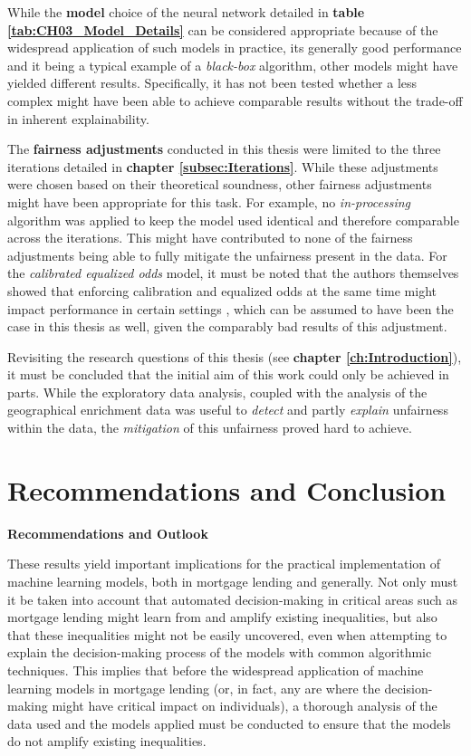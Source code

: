 While the \textbf{model} choice of the neural network detailed in \textbf{table \ref{tab:CH03_Model_Details}} can be considered appropriate because of the widespread application of such models in practice, its generally good performance and it being a typical example of a \textit{black-box} algorithm, other models might have yielded different results.
Specifically, it has not been tested whether a less complex might have been able to achieve comparable results without the trade-off in inherent explainability.

The \textbf{fairness adjustments} conducted in this thesis were limited to the three iterations detailed in \textbf{chapter \ref{subsec:Iterations}}. While these adjustments were chosen based on their theoretical soundness, other fairness adjustments might have been appropriate for this task.
For example, no \textit{in-processing} algorithm was applied to keep the model used identical and therefore comparable across the iterations. This might have contributed to none of the fairness adjustments being able to fully mitigate the unfairness present in the data.
For the \textit{calibrated equalized odds} model, it must be noted that the authors themselves showed that enforcing calibration and equalized odds at the same time might impact performance in certain settings \parencite{Pleiss2017}, which can be assumed to have been the case in this thesis as well, given the comparably bad results of this adjustment.

Revisiting the research questions of this thesis (see \textbf{chapter \ref{ch:Introduction}}), it must be concluded that the initial aim of this work could only be achieved in parts. 
While the exploratory data analysis, coupled with the analysis of the geographical enrichment data was useful to \textit{detect} and partly \textit{explain} unfairness within the data, the \textit{mitigation} of this unfairness proved hard to achieve. 

\section{Recommendations and Conclusion}\label{sec:conclusion}

\textbf{Recommendations and Outlook}

These results yield important implications for the practical implementation of machine learning models, both in mortgage lending and generally. Not only must it be taken into account that automated decision-making in critical areas such as mortgage lending might learn from and amplify existing inequalities, but also that these inequalities might not be easily uncovered, even when attempting to explain the decision-making process of the models with common algorithmic techniques.
This implies that before the widespread application of machine learning models in mortgage lending (or, in fact, any are where the decision-making might have critical impact on individuals), a thorough analysis of the data used and the models applied must be conducted to ensure that the models do not amplify existing inequalities.

